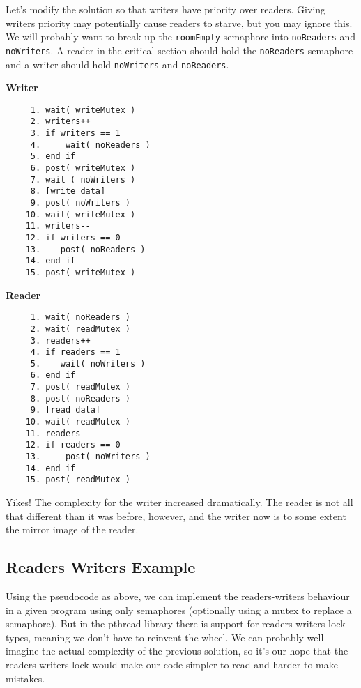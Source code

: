 Let's modify the solution so that writers have priority over readers. Giving writers priority may potentially cause readers to starve, but you may ignore this. We will probably want to break up the \texttt{roomEmpty} semaphore into \texttt{noReaders} and \texttt{noWriters}. A reader in the critical section should hold the \texttt{noReaders} semaphore and a writer should hold \texttt{noWriters} and \texttt{noReaders}. 

\begin{multicols}{2}
\textbf{Writer}\vspace{-1em}
  \begin{verbatim}
     1. wait( writeMutex )
     2. writers++
     3. if writers == 1
     4.     wait( noReaders )
     5. end if
     6. post( writeMutex )
     7. wait ( noWriters )
     8. [write data]
     9. post( noWriters ) 
    10. wait( writeMutex )
    11. writers--
    12. if writers == 0
    13.    post( noReaders )
    14. end if
    15. post( writeMutex )     
  \end{verbatim}
\columnbreak
\textbf{Reader}\vspace{-2em}
  \begin{verbatim}
     1. wait( noReaders )
     2. wait( readMutex )
     3. readers++
     4. if readers == 1
     5.    wait( noWriters )
     6. end if
     7. post( readMutex )
     8. post( noReaders )
     9. [read data]
    10. wait( readMutex )
    11. readers--
    12. if readers == 0
    13.     post( noWriters )
    14. end if
    15. post( readMutex )
\end{verbatim}
\end{multicols}
\vspace{-2em}

Yikes! The complexity for the writer increased dramatically. The reader is not all that different than it was before, however, and the writer now is to some extent the mirror image of the reader. 

\subsection*{Readers Writers Example} 
Using the pseudocode as above, we can implement the readers-writers behaviour in a given program using only semaphores (optionally using a mutex to replace a semaphore). But in the pthread library there is support for readers-writers lock types, meaning we don't have to reinvent the wheel. We can probably well imagine the actual complexity of the previous solution, so it's our hope that the readers-writers lock would make our code simpler to read and harder to make mistakes.

